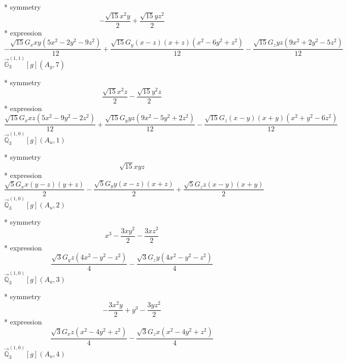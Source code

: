 \documentclass[fleqn,8pt]{jsarticle}
\begin{document}
\noindent\quad ** symmetry
\begin{dmath*}
- \frac{\sqrt{15} x^{2} y}{2} + \frac{\sqrt{15} y z^{2}}{2}
\end{dmath*}
\noindent\quad ** expression
\begin{dmath*}
- \frac{\sqrt{15} G_{x} x y \left(5 x^{2} - 2 y^{2} - 9 z^{2}\right)}{12} + \frac{\sqrt{15} G_{y} \left(x - z\right) \left(x + z\right) \left(x^{2} - 6 y^{2} + z^{2}\right)}{12} - \frac{\sqrt{15} G_{z} y z \left(9 x^{2} + 2 y^{2} - 5 z^{2}\right)}{12}
\end{dmath*}
\noindent\quad $\vec{\mathbb{G}}_{3}^{(1,1)}[g](A_{g},7)$

\noindent\quad ** symmetry
\begin{dmath*}
\frac{\sqrt{15} x^{2} z}{2} - \frac{\sqrt{15} y^{2} z}{2}
\end{dmath*}
\noindent\quad ** expression
\begin{dmath*}
\frac{\sqrt{15} G_{x} x z \left(5 x^{2} - 9 y^{2} - 2 z^{2}\right)}{12} + \frac{\sqrt{15} G_{y} y z \left(9 x^{2} - 5 y^{2} + 2 z^{2}\right)}{12} - \frac{\sqrt{15} G_{z} \left(x - y\right) \left(x + y\right) \left(x^{2} + y^{2} - 6 z^{2}\right)}{12}
\end{dmath*}
\noindent\quad $\vec{\mathbb{Q}}_{3}^{(1,0)}[g](A_{u},1)$

\noindent\quad ** symmetry
\begin{dmath*}
\sqrt{15} x y z
\end{dmath*}
\noindent\quad ** expression
\begin{dmath*}
\frac{\sqrt{5} G_{x} x \left(y - z\right) \left(y + z\right)}{2} - \frac{\sqrt{5} G_{y} y \left(x - z\right) \left(x + z\right)}{2} + \frac{\sqrt{5} G_{z} z \left(x - y\right) \left(x + y\right)}{2}
\end{dmath*}
\noindent\quad $\vec{\mathbb{Q}}_{3}^{(1,0)}[g](A_{u},2)$

\noindent\quad ** symmetry
\begin{dmath*}
x^{3} - \frac{3 x y^{2}}{2} - \frac{3 x z^{2}}{2}
\end{dmath*}
\noindent\quad ** expression
\begin{dmath*}
\frac{\sqrt{3} G_{y} z \left(4 x^{2} - y^{2} - z^{2}\right)}{4} - \frac{\sqrt{3} G_{z} y \left(4 x^{2} - y^{2} - z^{2}\right)}{4}
\end{dmath*}
\noindent\quad $\vec{\mathbb{Q}}_{3}^{(1,0)}[g](A_{u},3)$

\noindent\quad ** symmetry
\begin{dmath*}
- \frac{3 x^{2} y}{2} + y^{3} - \frac{3 y z^{2}}{2}
\end{dmath*}
\noindent\quad ** expression
\begin{dmath*}
\frac{\sqrt{3} G_{x} z \left(x^{2} - 4 y^{2} + z^{2}\right)}{4} - \frac{\sqrt{3} G_{z} x \left(x^{2} - 4 y^{2} + z^{2}\right)}{4}
\end{dmath*}
\noindent\quad $\vec{\mathbb{Q}}_{3}^{(1,0)}[g](A_{u},4)$
\end{document}
